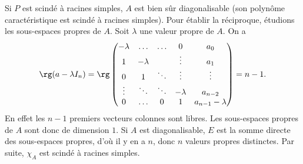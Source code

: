 \documentclass[fontsize=12pt,twoside=false,parskip=half, french]{scrartcl}
\begin{document}
      Si $P$ est scindé à racines simples, $A$ est bien sûr diagonalisable (son polynôme caractéristique est scindé à 
      racines simples). Pour établir la réciproque, étudions les sous-espaces propres de $A$. Soit $\lambda$ une valeur
      propre de $A$. On a
      \[
         \rg(a - \lambda I_n) = \rg       
            \begin{pmatrix}
              -\lambda & \ldots   & \ldots & 0        & a_0\\
               1       & -\lambda &        & \vdots   & a_1\\
               0       & 1        & \ddots & \vdots   & \vdots\\
               \vdots  & \ddots   & \ddots & -\lambda & a_{n - 2}\\
               0       & \ldots   & 0      & 1        & a_{n - 1} -\lambda 
            \end{pmatrix} = n - 1.
      \]
      En effet les $n - 1$ premiers vecteurs colonnes sont libres. Les sous-espaces propres de $A$ sont donc de 
      dimension $1$. Si $A$ est diagonalisable, $E$ est la somme directe des sous-espaces propres, d’où il y en
      a $n$, donc $n$ valeurs propres distinctes. Par suite, $\chi_A$ est scindé à racines simples.
\end{document}
